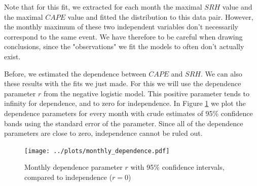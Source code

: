 \documentclass[10pt,conference,compsocconf]{IEEEtran}
\begin{document}
Note that for this fit, we extracted for each month the maximal $SRH$ value and the maximal $CAPE$ value and fitted the distribution to this data pair. However, the monthly maximum of these two independent variables don't necessarily correspond to the same event. We have therefore to be careful when drawing conclusions, since the "observations" we fit the models to often don't actually exist.
\par
Before, we estimated the dependence between $CAPE$ and $SRH$. We can also these results with the fits we just made. For this we will use the dependence parameter $r$ from the negative logistic model. This positive parameter tends to infinity for dependence, and to zero for independence. In Figure \ref{fig:cape_srh_dependance_logistic} we plot the dependence parameters for every month with crude estimates of 95\% confidence bands using the standard error of the parameter. Since all of the dependence parameters are close to zero, independence cannot be ruled out. 

\begin{figure}
	\centering
	\texttt{[image: ../plots/monthly\_dependence.pdf]}
	\caption{Monthly dependence parameter $r$ with 95\% confidence intervals, compared to independence ($r=0$)}
	\label{fig:cape_srh_dependance_logistic}
\end{figure}
\end{document}
